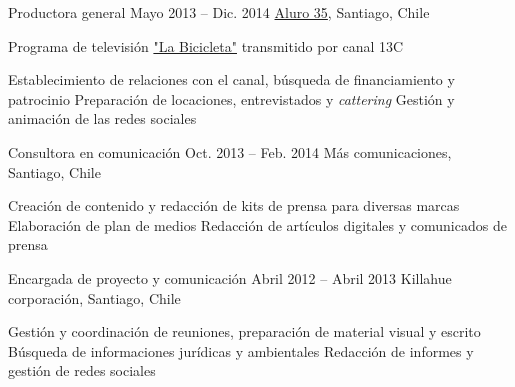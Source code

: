 \begin{joblist}
\item[Productora general]{Mayo 2013 -- Dic. 2014}
    {
    \href{https://www.aluro35.com/}  {Aluro 35}, Santiago, Chile
    }
    {
        Programa de televisión \href{http://www.13.cl/c/programas/la-bicicleta}{"La Bicicleta"} transmitido por canal 13C \\
        \iftbftiny \vspace{-0.5cm} \fi
        \begin{itemize}
            \iftbftiny \setlength\itemsep{-3pt} \fi
            \cvitem[\checkmark] Establecimiento de relaciones con el canal, búsqueda de financiamiento y patrocinio
            \cvitem[\checkmark] Preparación de locaciones, entrevistados y \textit{cattering}
            \cvitem[\checkmark] Gestión y animación de las redes sociales
        \end{itemize}
    }



\item[Consultora en comunicación]{Oct. 2013 -- Feb. 2014 }
    {
    Más comunicaciones, Santiago, Chile
    }
    {
        \iftbftiny \vspace{-0.5cm} \fi
        \begin{itemize}
            \iftbftiny \setlength\itemsep{-3pt} \fi
            \cvitem[\checkmark]  Creación de contenido y redacción de kits de prensa para diversas marcas
            \cvitem[\checkmark]  Elaboración de plan de medios
            \cvitem[\checkmark]  Redacción de artículos digitales y comunicados de prensa
        \end{itemize}
    }

\item[Encargada de proyecto y comunicación]{Abril 2012 -- Abril 2013 \vspace{0.2cm}}
    {
    Killahue corporación, Santiago, Chile
    }
    {

        \iftbftiny \vspace{-0.5cm} \fi
        \begin{itemize}
            \iftbftiny \setlength\itemsep{-3pt} \fi
            \cvitem[\checkmark] Gestión y coordinación de reuniones, preparación de material visual y escrito
            \cvitem[\checkmark] Búsqueda de informaciones jurídicas y ambientales
            \cvitem[\checkmark] Redacción de informes y gestión de redes sociales
        \end{itemize}
    }




\end{joblist}


